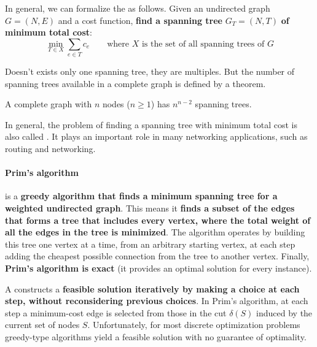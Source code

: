 \newpage

\noindent
In general, we can formalize the  as follows. Given an undirected graph $G = \left(N,E\right)$ and a cost function, \textbf{find a spanning tree} $G_{T} = \left(N, T\right)$ \textbf{of minimum total cost}:
\begin{equation}
    \underset{T \in X}{\min} \displaystyle\sum_{e \in T} c_{e} \hspace{2em} \text{where } X \text{ is the set of all spanning trees of } G
\end{equation}

\highspace
Doesn't exists only one spanning tree, they are multiples. But the number of spanning trees available in a complete graph is defined by a theorem.
\begin{theorem}[Cayley, 1889]
    A complete graph with $n$ nodes ($n \ge 1$) has $n^{n-2}$ spanning trees.
\end{theorem}

\noindent
In general, the problem of finding a spanning tree with minimum total cost is also called . It plays an important role in many networking applications, such as routing and networking.\cite{10.1007/978-3-642-38853-8_14}

\newpage

\paragraph{Prim's algorithm}\label{paragraph: Prim's algorithm}

\begin{definitionbox}[: Prim's]
     is a \textbf{greedy algorithm that finds a minimum spanning tree for a weighted undirected graph}. This means it \textbf{finds a subset of the edges that forms a tree that includes every vertex, where the total weight of all the edges in the tree is minimized}. The algorithm operates by building this tree one vertex at a time, from an arbitrary starting vertex, at each step adding the cheapest possible connection from the tree to another vertex. Finally, \textbf{Prim's algorithm is exact} (it provides an optimal solution for every instance).
\end{definitionbox}

\highspace
A  constructs a \textbf{feasible solution iteratively by making a  choice at each step, without reconsidering previous choices}. In Prim's algorithm, at each step a minimum-cost edge is selected from those in the cut $\delta\left(S\right)$ induced by the current set of nodes $S$. Unfortunately, for most discrete optimization problems greedy-type algorithms yield a feasible solution with no guarantee of optimality.

